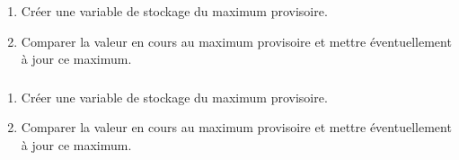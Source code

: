\documentclass[svgnames,11pt]{beamer}
\begin{document}
\begin{frame}
    \frametitle{}

    \begin{center}
    \end{center}
    \begin{enumerate}
        \item Créer une variable de stockage du maximum provisoire.
        \item Comparer la valeur en cours au maximum provisoire et mettre éventuellement à jour ce maximum.
    \end{enumerate}
\end{frame}
\begin{frame}
    \frametitle{}

    \begin{center}
    \end{center}
    \begin{enumerate}
        \item Créer une variable de stockage du maximum provisoire.
        \item Comparer la valeur en cours au maximum provisoire et mettre éventuellement à jour ce maximum.
    \end{enumerate}
\end{frame}
\end{document}
